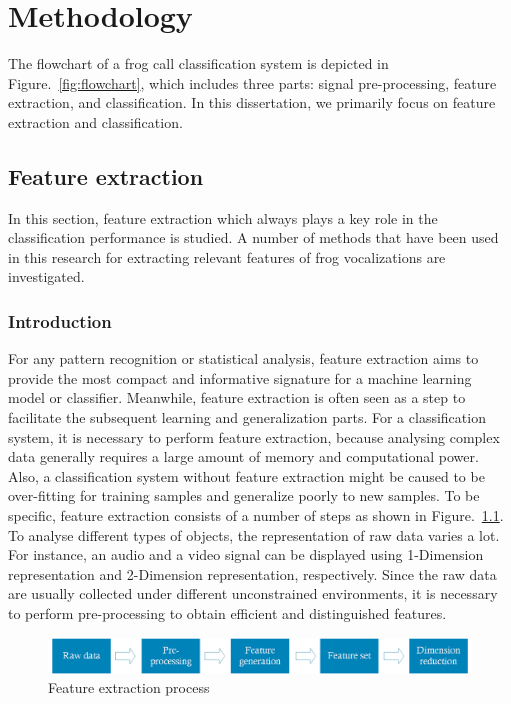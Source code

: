 
\chapter[Methodology]{Methodology}
\label{cha:cha3Method}

The flowchart of a frog call classification system is depicted in Figure.~\ref{fig:flowchart}, which includes three parts: signal pre-processing, feature extraction, and classification. In this dissertation, we primarily focus on feature extraction and classification.


\section{Feature extraction}

In this section, feature extraction which always plays a key role in the classification performance is studied. A number of methods that have been used in this research for extracting relevant features of frog vocalizations are investigated.

\subsection{Introduction}

For any pattern recognition or statistical analysis, feature extraction aims to provide the most compact and informative signature for a machine learning model or classifier. Meanwhile, feature extraction is often seen as a step to facilitate the subsequent learning and generalization parts. For a classification system, it is necessary to perform feature extraction, because analysing complex data generally requires a large amount of memory and computational power. Also, a classification system without feature extraction might be caused to be over-fitting for training samples and generalize poorly to new samples.  To be specific, feature extraction consists of a number of steps as shown in Figure.~\ref{fig:feature_extraction}. To analyse different types of objects, the representation of raw data varies a lot. For instance, an audio and a video signal can be displayed using 1-Dimension representation and 2-Dimension representation, respectively.  Since the raw data are usually collected under different unconstrained environments, it is necessary to perform pre-processing to obtain efficient and distinguished features.   


\begin{figure}[htb!]
\centering
\includegraphics[width=\textwidth]{image/Method/feature_extraction.png}
\caption[Feature extraction process]{Feature extraction process}
\label{fig:feature_extraction}
\end{figure}

